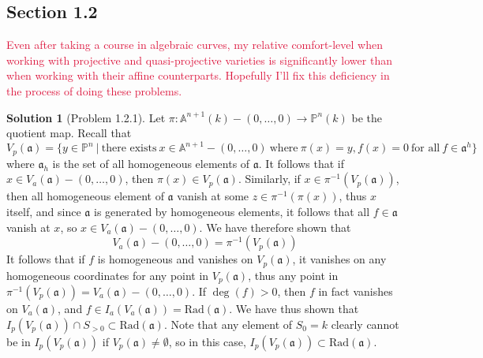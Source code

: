 \documentclass[aps,pra,showpacs,notitlepage,onecolumn,superscriptaddress,nofootinbib]{revtex4-1}
\newcommand{\pop}[1]{\textcolor{crimson}{#1}}
\theoremstyle{definition}
\newtheorem{solution}{Solution}[section]
\begin{document}
\subsection{Section 1.2}

\noindent \pop{Even after taking a course in algebraic curves, my relative comfort-level when working with projective and quasi-projective varieties is significantly lower than when working with
  their affine counterparts. Hopefully I'll fix this deficiency in the process of doing these problems.}

\begin{solution}[Problem 1.2.1]
  Let $\pi : \mathbb{A}^{n + 1}(k) - (0, \dots, 0) \rightarrow \mathbb{P}^n(k)$ be the quotient map. Recall that
  \begin{equation}
    V_p(\mathfrak{a}) = \{ y \in \mathbb{P}^{n} \ | \ \text{there exists} \ x \in \mathbb{A}^{n + 1} - (0, \dots, 0) \ \text{where} \ \pi(x) = y, f(x) = 0 \ \text{for all} \ f \in \mathfrak{a}^h\}
    \end{equation}
  where $\mathfrak{a}_h$ is the set of all homogeneous elements of $\mathfrak{a}$. It follows that if $x \in V_a(\mathfrak{a}) - (0, \dots, 0)$, then $\pi(x) \in V_p(\mathfrak{a})$. Similarly,
  if $x \in \pi^{-1}(V_p(\mathfrak{a}))$, then all homogeneous element of $\mathfrak{a}$ vanish at some $z \in \pi^{-1}(\pi(x))$, thus $x$ itself, and since $\mathfrak{a}$ is generated by homogeneous elements, it follows
  that all $f \in \mathfrak{a}$ vanish at $x$, so $x \in V_a(\mathfrak{a}) - (0, \dots, 0)$. We have therefore shown that
  \begin{equation}
    V_a(\mathfrak{a}) - (0, \dots, 0) = \pi^{-1}(V_p(\mathfrak{a}))
    \end{equation}
  It follows that if $f$ is homogeneous and vanishes on $V_p(\mathfrak{a})$, it vanishes on any homogeneous coordinates for any point in $V_p(\mathfrak{a})$, thus any point in $\pi^{-1}(V_p(\mathfrak{a})) = V_a(\mathfrak{a}) - (0, \dots, 0)$.
  If $\deg(f) > 0$, then $f$ in fact vanishes on $V_a(\mathfrak{a})$, and $f \in I_a(V_a(\mathfrak{a})) = \text{Rad}(\mathfrak{a})$. We have thus shown that $I_p(V_p(\mathfrak{a})) \cap S_{> 0} \subset \text{Rad}(\mathfrak{a})$. Note that
  any element of $S_0 = k$ clearly cannot be in $I_p(V_p(\mathfrak{a}))$ if $V_p(\mathfrak{a}) \neq \emptyset$, so in this case, $I_p(V_p(\mathfrak{a})) \subset \text{Rad}(\mathfrak{a})$.
  \end{solution}
\end{document}
